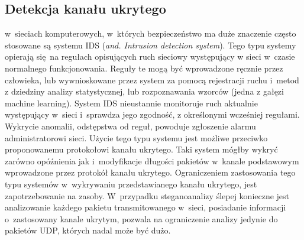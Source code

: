 \documentclass[a4paper, twoside, 12pt]{report}
\begin{document}
       \subsection{Detekcja kanału ukrytego}
       w~sieciach komputerowych, w~których bezpieczeństwo ma duże znaczenie często
       stosowane są systemu IDS (\emph{and. Intrusion detection system}). Tego typu
       systemy opierają się na regułach opisujących ruch sieciowy występujący w
       sieci w~czasie normalnego funkcjonowania. Reguły te mogą być wprowadzone ręcznie
       przez człowieka, lub wywnioskowane przez system za pomocą rejestracji ruchu i~metod z dziedziny
       analizy statystycznej, lub rozpoznawania wzorców (jedna z gałęzi machine learning)\cite{IDSDESCRIPTION}.
       System IDS nieustannie monitoruje ruch aktualnie występujący w~sieci i~sprawdza
       jego zgodność, z określonymi wcześniej regułami. Wykrycie anomalii, odstępstwa
       od reguł, powoduje zgłoszenie alarmu administratorowi sieci. Użycie tego
       typu systemu jest możliwe przeciwko proponowanemu protokołowi kanału ukrytego.
       Taki system mógłby wykryć zarówno opóźnienia jak i~modyfikacje długości
       pakietów w~kanale podstawowym wprowadzone przez protokół kanału ukrytego.
       Ograniczeniem zastosowania tego typu systemów w~wykrywaniu przedstawianego kanału
       ukrytego, jest zapotrzebowanie na zasoby. W~przypadku steganoanalizy ślepej
       konieczne jest analizowanie każdego pakietu transmitowanego w~sieci, posiadanie
       informacji o~zastosowany kanale ukrytym, pozwala na ograniczenie analizy jedynie
       do pakietów UDP, których nadal może być dużo.
\end{document}
